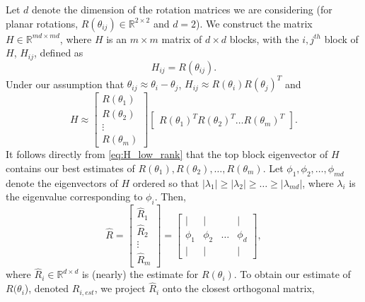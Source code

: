 Let $d$ denote the dimension of the rotation matrices we are considering (for planar rotations, $R(\theta_{ij}) \in \mathbb{R}^{2 \times 2}$ and $d=2$).
%
We construct the matrix $H \in \mathbb{R}^{md \times md}$, where $H$ is an $m \times m$ matrix of $d \times d$ blocks, with the $i,j^{th}$ block of $H$, $H_{ij}$, defined as
\begin{equation} \label{eq:H_to_R}
H_{ij} = R(\theta_{ij}).
\end{equation}
%
%
Under our assumption that $\theta_{ij} \approx \theta_i - \theta_j$, $H_{ij} \approx R(\theta_i) R(\theta_j)^T$
 and
\begin{equation} \label{eq:H_low_rank}
	H \approx
	\begin{bmatrix}
	R(\theta_1) \\
	R(\theta_2) \\
	\vdots \\
	R(\theta_m)
	\end{bmatrix}
	\begin{bmatrix}
	R(\theta_1)^T R(\theta_2)^T \dots R(\theta_m)^T
	\end{bmatrix}.
\end{equation}
%
It follows directly from \eqref{eq:H_low_rank} that the top block eigenvector of $H$ contains our best estimates of $R(\theta_1), R(\theta_2), \dots, R(\theta_m)$.
%
Let $\phi_1, \phi_2, \dots, \phi_{md}$ denote the eigenvectors of $H$ ordered so that $|\lambda_1| \ge |\lambda_2| \ge \dots \ge |\lambda_{md}|$, where $\lambda_i$ is the eigenvalue corresponding to $\phi_i$.
%
Then,
\begin{equation} \label{eq:R_hat}
\hat{R} =
\begin{bmatrix}
\hat{R}_1 \\
\hat{R}_2 \\
\vdots \\
\hat{R}_m
\end{bmatrix} =
\begin{bmatrix}
| & | & & | \\
\phi_1 & \phi_2 & \dots & \phi_d \\
| & | & & |
\end{bmatrix},
\end{equation}
where $\hat{R}_i \in \mathbb{R}^{d \times d}$ is (nearly) the estimate for $R(\theta_i)$.
%
To obtain our estimate of $R(\theta_i$), denoted $R_{i, est}$, we project $\hat{R}_i$ onto the closest orthogonal matrix,
